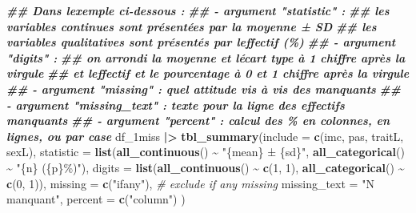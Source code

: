 \documentclass[
]{book}
\newenvironment{Shaded}{\begin{snugshade}}{\end{snugshade}}
\newcommand{\AttributeTok}[1]{\textcolor[rgb]{0.13,0.29,0.53}{#1}}
\newcommand{\CommentTok}[1]{\textcolor[rgb]{0.56,0.35,0.01}{\textit{#1}}}
\newcommand{\DecValTok}[1]{\textcolor[rgb]{0.00,0.00,0.81}{#1}}
\newcommand{\DocumentationTok}[1]{\textcolor[rgb]{0.56,0.35,0.01}{\textbf{\textit{#1}}}}
\newcommand{\FunctionTok}[1]{\textcolor[rgb]{0.13,0.29,0.53}{\textbf{#1}}}
\newcommand{\NormalTok}[1]{#1}
\newcommand{\SpecialCharTok}[1]{\textcolor[rgb]{0.81,0.36,0.00}{\textbf{#1}}}
\newcommand{\StringTok}[1]{\textcolor[rgb]{0.31,0.60,0.02}{#1}}
\begin{document}
\begin{Shaded}
\begin{Highlighting}[]
\DocumentationTok{\#\# Dans l\textquotesingle{}exemple ci{-}dessous :}
\DocumentationTok{\#\# {-} argument "statistic" : }
\DocumentationTok{\#\#   les variables continues sont présentées par la moyenne ± SD}
\DocumentationTok{\#\#   les variables qualitatives sont présentés par l\textquotesingle{}effectif (\%)}
\DocumentationTok{\#\# {-} argument "digits" :}
\DocumentationTok{\#\#   on arrondi la moyenne et l\textquotesingle{}écart type à 1 chiffre après la virgule}
\DocumentationTok{\#\#   et l\textquotesingle{}effectif et le pourcentage à 0 et 1 chiffre après la virgule}
\DocumentationTok{\#\# {-} argument "missing" : quel attitude vis à vis des manquants}
\DocumentationTok{\#\# {-} argument "missing\_text" : texte pour la ligne des effectifs manquants}
\DocumentationTok{\#\# {-} argument "percent" : calcul des \% en colonnes, en lignes, ou par case}
\NormalTok{df\_1miss }\SpecialCharTok{|\textgreater{}} 
  \FunctionTok{tbl\_summary}\NormalTok{(}\AttributeTok{include =} \FunctionTok{c}\NormalTok{(imc, pas, traitL, sexL), }
              \AttributeTok{statistic =} \FunctionTok{list}\NormalTok{(}\FunctionTok{all\_continuous}\NormalTok{() }\SpecialCharTok{\textasciitilde{}} \StringTok{"\{mean\} ± \{sd\}"}\NormalTok{, }
                                \FunctionTok{all\_categorical}\NormalTok{() }\SpecialCharTok{\textasciitilde{}} \StringTok{"\{n\} (\{p\}\%)"}\NormalTok{),}
              \AttributeTok{digits =} \FunctionTok{list}\NormalTok{(}\FunctionTok{all\_continuous}\NormalTok{() }\SpecialCharTok{\textasciitilde{}} \FunctionTok{c}\NormalTok{(}\DecValTok{1}\NormalTok{, }\DecValTok{1}\NormalTok{), }
                            \FunctionTok{all\_categorical}\NormalTok{() }\SpecialCharTok{\textasciitilde{}} \FunctionTok{c}\NormalTok{(}\DecValTok{0}\NormalTok{, }\DecValTok{1}\NormalTok{)),}
              \AttributeTok{missing =} \FunctionTok{c}\NormalTok{(}\StringTok{"ifany"}\NormalTok{), }\CommentTok{\# exclude if any missing}
              \AttributeTok{missing\_text =} \StringTok{"N manquant"}\NormalTok{, }
              \AttributeTok{percent =} \FunctionTok{c}\NormalTok{(}\StringTok{"column"}\NormalTok{)}
\NormalTok{              )}
\end{Highlighting}
\end{Shaded}
\end{document}
